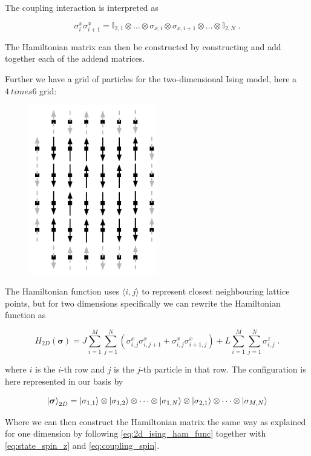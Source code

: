 The coupling interaction is interpreted as

\begin{equation}
  \sigma_i^x \sigma_{i+1}^x = \mathbb{I}_{2, 1} \otimes \dots \otimes \sigma_{x, i} \otimes \sigma_{x, i+1} \otimes \dots \otimes \mathbb{I}_{2, N} \; .
  \label{eq:coupling_spin}
\end{equation}

The Hamiltonian matrix can then be constructed by constructing and add together each of the addend matrices. 

Further we have a grid of particles for the two-dimensional Ising model, here a $4\ times 6$ grid:

\begin{figure}[H]
  \begin{center}
    \includegraphics[width=0.5\textwidth]{Figures/Drawn/Ising/2dciclous}
  \end{center}
\end{figure}

The Hamiltonian function uses $\langle i, j\rangle$ to represent closest neighbouring lattice points, but for two dimensions specifically we can rewrite the Hamiltonian function as

\begin{equation}
  H_{2D}(\boldsymbol{\sigma}) =J\sum_{i = 1}^M\sum_{j = 1}^N \left (\sigma^x_{i, j}\sigma^x_{i, j + 1} + \sigma_{i, j}^x\sigma^x_{i+1, j} \right )+ L \sum_{i = 1}^M\sum_{j = 1}^N\sigma^z_{i, j} \; .
  \label{eq:2d_ising_ham_func}
\end{equation}

where $i$ is the $i$-th row and $j$ is the $j$-th particle in that row. The configuration is here represented in our basis by 

$$\ket{\boldsymbol{\sigma}}_{2D} = \ket{\sigma_{1, 1}} \otimes \ket{\sigma_{1, 2}} \otimes \dots \otimes \ket{\sigma_{1, N}} \otimes \ket{\sigma_{2, 1}} \otimes \dots \otimes \ket{\sigma_{M, N}}$$

Where we can then construct the Hamiltonian matrix the same way as explained for one dimension by following \ref{eq:2d_ising_ham_func} together with \ref{eq:state_spin_z} and \ref{eq:coupling_spin}.
